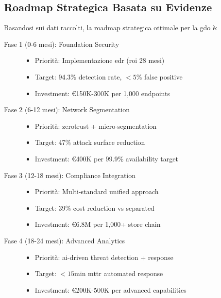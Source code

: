 \subsection{Roadmap Strategica Basata su Evidenze}
\label{subsec:roadmap-strategica}

Basandosi sui dati raccolti, la roadmap strategica ottimale per la \gls{gdo} è:

\begin{description}
    \item[Fase 1 (0-6 mesi): Foundation Security]
    \begin{itemize}
        \item Priorità: Implementazione \gls{edr} (\gls{roi} 28 mesi)
        \item Target: 94.3\% detection rate, $<5$\% false positive
        \item Investment: €150K-300K per 1,000 endpoints
    \end{itemize}
    
    \item[Fase 2 (6-12 mesi): Network Segmentation]
    \begin{itemize}
        \item Priorità: \gls{zerotrust} + micro-segmentation
        \item Target: 47\% attack surface reduction
        \item Investment: €400K per 99.9\% availability target
    \end{itemize}
    
    \item[Fase 3 (12-18 mesi): Compliance Integration]
    \begin{itemize}
        \item Priorità: Multi-standard unified approach
        \item Target: 39\% cost reduction vs separated
        \item Investment: €6.8M per 1,000+ store chain
    \end{itemize}
    
    \item[Fase 4 (18-24 mesi): Advanced Analytics]
    \begin{itemize}
        \item Priorità: \gls{ai}-driven threat detection + response
        \item Target: $<15$min \gls{mttr} automated response
        \item Investment: €200K-500K per advanced capabilities
    \end{itemize}
\end{description}

